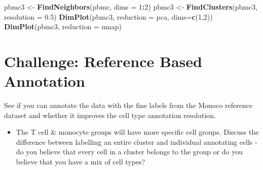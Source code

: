 \documentclass[
]{book}
\newenvironment{Shaded}{\begin{snugshade}}{\end{snugshade}}
\newcommand{\AttributeTok}[1]{\textcolor[rgb]{0.13,0.29,0.53}{#1}}
\newcommand{\DecValTok}[1]{\textcolor[rgb]{0.00,0.00,0.81}{#1}}
\newcommand{\FloatTok}[1]{\textcolor[rgb]{0.00,0.00,0.81}{#1}}
\newcommand{\FunctionTok}[1]{\textcolor[rgb]{0.13,0.29,0.53}{\textbf{#1}}}
\newcommand{\NormalTok}[1]{#1}
\newcommand{\OtherTok}[1]{\textcolor[rgb]{0.56,0.35,0.01}{#1}}
\newcommand{\SpecialCharTok}[1]{\textcolor[rgb]{0.81,0.36,0.00}{\textbf{#1}}}
\newcommand{\StringTok}[1]{\textcolor[rgb]{0.31,0.60,0.02}{#1}}
\providecommand{\tightlist}{%
  \setlength{\itemsep}{0pt}\setlength{\parskip}{0pt}}
\begin{document}
\begin{Shaded}
\begin{Highlighting}[]
\NormalTok{pbmc3 }\OtherTok{\textless{}{-}} \FunctionTok{FindNeighbors}\NormalTok{(pbmc, }\AttributeTok{dims =} \DecValTok{1}\SpecialCharTok{:}\DecValTok{2}\NormalTok{)}
\NormalTok{pbmc3 }\OtherTok{\textless{}{-}} \FunctionTok{FindClusters}\NormalTok{(pbmc3, }\AttributeTok{resolution =} \FloatTok{0.5}\NormalTok{)}
\FunctionTok{DimPlot}\NormalTok{(pbmc3, }\AttributeTok{reduction =} \StringTok{\textquotesingle{}pca\textquotesingle{}}\NormalTok{, }\AttributeTok{dims=}\FunctionTok{c}\NormalTok{(}\DecValTok{1}\NormalTok{,}\DecValTok{2}\NormalTok{))}
\FunctionTok{DimPlot}\NormalTok{(pbmc3, }\AttributeTok{reduction =} \StringTok{\textquotesingle{}umap\textquotesingle{}}\NormalTok{)}
\end{Highlighting}
\end{Shaded}

\section{Challenge: Reference Based Annotation}\label{challenge-reference-based-annotation}

See if you can annotate the data with the fine labels from the Monoco reference dataset and whether it improves the cell type annotation resolution.

\begin{Shaded}
\end{Shaded}

\begin{itemize}
\tightlist
\item
  The T cell \& monocyte groups will have more specific cell groups. Discuss the difference between labelling an entire cluster and individual annotating cells - do you believe that every cell in a cluster belongs to the group or do you believe that you have a mix of cell types?
\end{itemize}
\end{document}
